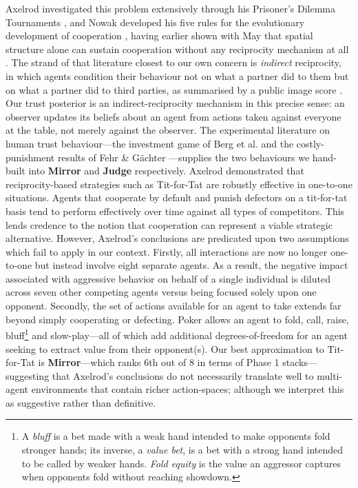 \documentclass[10pt,twocolumn,letterpaper]{article}
\newcommand{\arch}[1]{\textbf{#1}}
\begin{document}
Axelrod investigated this problem extensively through his Prisoner's
Dilemma Tournaments \citep{axelrod1984evolution}, and Nowak
developed his five rules for the evolutionary development of
cooperation \citep{nowak2006five}, having earlier shown with May
that spatial structure alone can sustain cooperation without any
reciprocity mechanism at all \citep{nowak1992spatial}. The strand of
that literature closest to our own concern is \emph{indirect}
reciprocity, in which agents condition their behaviour not on what a
partner did to them but on what a partner did to third parties, as
summarised by a public image score \citep{nowak1998evolution,
nowak2005evolution}. Our trust posterior is an indirect-reciprocity
mechanism in this precise sense: an observer updates its beliefs
about an agent from actions taken against everyone at the table, not
merely against the observer. The experimental literature on human
trust behaviour---the investment game of Berg et al.
\citep{berg1995trust} and the costly-punishment results of Fehr \&
G\"achter \citep{fehr2000cooperation}---supplies the two behaviours
we hand-built into \arch{Mirror} and \arch{Judge} respectively.
Axelrod demonstrated that
reciprocity-based strategies such as Tit-for-Tat are robustly
effective in one-to-one situations. Agents that cooperate by default
and punish defectors on a tit-for-tat basis tend to perform
effectively over time against all types of competitors. This lends
credence to the notion that cooperation can represent a viable
strategic alternative. However, Axelrod's conclusions are predicated
upon two assumptions which fail to apply in our context. Firstly,
all interactions are now no longer one-to-one but instead involve
eight separate agents. As a result, the negative impact associated
with aggressive behavior on behalf of a single individual is diluted
across seven other competing agents versus being focused solely upon
one opponent. Secondly, the set of actions available for an agent to
take extends far beyond simply cooperating or defecting. Poker
allows an agent to fold, call, raise,
bluff\footnote{A \textit{bluff} is a bet made with a weak hand
intended to make opponents fold stronger hands; its inverse, a
\textit{value bet}, is a bet with a strong hand intended to be
called by weaker hands. \textit{Fold equity} is the value an
aggressor captures when opponents fold without reaching showdown.}
and slow-play---all of which add additional degrees-of-freedom for
an agent seeking to extract value from their opponent(s). Our best
approximation to Tit-for-Tat is \arch{Mirror}---which ranks 6th out
of 8 in terms of Phase 1 stacks---suggesting that Axelrod's conclusions do
not necessarily translate well to multi-agent environments that
contain richer action-spaces; although we interpret this as
suggestive rather than definitive.
\end{document}

